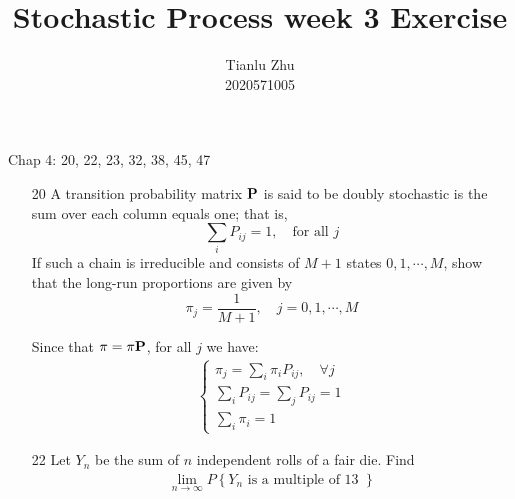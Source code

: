 \documentclass[en,hazy,blue,12pt,device = normal]{elegantnote}
\title{Stochastic Process week 3 Exercise}
\author{Tianlu Zhu \\ 2020571005}
\date{}
\begin{document}
\maketitle

Chap 4: 20, 22, 23, 32, 38, 45, 47

\begin{enumerate}
    \item[20] A transition probability matrix \({\textbf P}\) is said to be doubly stochastic is the sum over each column equals one; that is,
    \[\sum _i P_{ij } = 1, \quad \text{for all } j  \] 
    If such a chain is irreducible and consists of \(M+1\) states \(0,1,\cdots,M\), show that the long-run proportions are given by 
    \[\pi_j = \frac{1}{M+1},\quad j = 0,1,\cdots,M\]
    \begin{tcolorbox}
        \sol 

        Since that \(\pi = \pi \textbf P\), for all \(j \) we have:
        \begin{align*}
            \begin{cases}
                \pi _j = \sum _i \pi_i P_{ij },\quad \forall j\\
                \sum_iP_{ij } = \sum_j P_{ij } = 1\\
                \sum_i \pi_i = 1
            \end{cases}
        \end{align*}
    \end{tcolorbox}
    \item[22] Let \(Y_n\) be the sum of \(n\) independent rolls of a fair die. Find
    \begin{align*}
        \lim_{n\to\infty} P\left\{ Y_n \text{ is a multiple of 13 } \right\}
    \end{align*}
    
    \begin{tcolorbox}
        \sol


\end{tcolorbox}
\end{enumerate}
\end{document}
